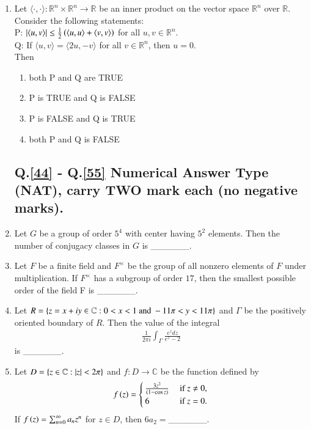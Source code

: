 \documentclass[journal]{IEEEtran}
\begin{document}
\begin{enumerate}
    \item Let $\langle \cdot, \cdot \rangle : \mathbb{R}^n \times \mathbb{R}^n \rightarrow \mathbb{R}$ be an inner product on the vector space $\mathbb{R}^n$ over $\mathbb{R}$. Consider the following statements:\\ P: $\left\vert\langle u,v \rangle\right\vert \leq \frac{1}{2}\left(\langle u,u \rangle + \langle v,v \rangle\right)$ for all $u,v \in \mathbb{R}^n$.\\Q: If $\langle u,v \rangle = \langle 2u,-v \rangle$ for all $v \in \mathbb{R}^n$, then $u=0$.\\Then
        \begin{enumerate}
            \item both P and Q are TRUE
            \item P is TRUE and Q is FALSE
            \item P is FALSE and Q is TRUE
            \item both P and Q is FALSE
        \end{enumerate}

    \subsection*{Q.\ref{44} - Q.\ref{55} Numerical Answer Type (NAT), carry TWO mark each (no negative marks).}
    \item \label{44} Let $G$ be a group of order $5^4$ with center having $5^2$ elements. Then the number of conjugacy classes in $G$ is \_\_\_\_\_\_.
    \item Let $F$ be a finite field and $F^{\times}$ be the group of all nonzero elements of $F$ under multiplication. If $F^{\times}$ has a subgroup of order $17$, then the smallest possible order of the field F is \_\_\_\_\_\_.
    \item Let $R = \left\{z = x + iy \in \mathbb{C} : 0< x<1 \text{ and }-11 \pi < y < 11 \pi\right\}$ and $\Gamma$ be the positively oriented boundary of $R$. Then the value of the integral
        \begin{align*}
            \frac{1}{2 \pi i} \int_{\Gamma} \frac{e^z dz}{e^z - 2}
        \end{align*}
        is \_\_\_\_\_\_.

    \item Let $D = \left\{z \in \mathbb{C} : \left\vert z\right\vert < 2 \pi\right\}$ and $f : D \rightarrow \mathbb{C}$ be the function defined by
        \begin{align*}
            f\left(z\right) = 
            \begin{cases}
                \frac{3 z^2}{\left(1 - \cos z\right)} &\text{ if } z \neq 0,\\
                6 &\text{ if } z = 0.
            \end{cases}
        \end{align*}
        If $f\left(z\right) = \sum_{n=0}^{\infty} a_n z^n$ for $z \in D$, then $6a_2=$\_\_\_\_\_\_.


\end{enumerate}
\end{document}
